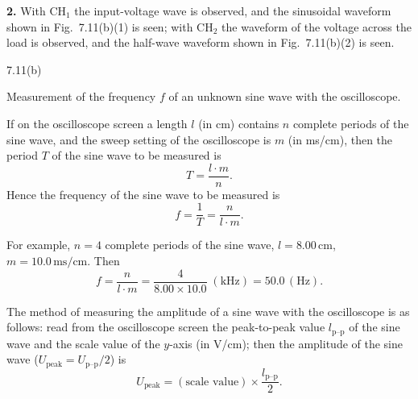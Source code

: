 \textbf{2.} With $\mathrm{CH}_1$ the input-voltage wave is observed, and the sinusoidal waveform shown in Fig.~7.11(b)(1) is seen; with $\mathrm{CH}_2$ the waveform of the voltage across the load is observed, and the half-wave waveform shown in Fig.~7.11(b)(2) is seen.

\begin{figbox}{7.11(b)}
\end{figbox}

Measurement of the frequency $f$ of an unknown sine wave with the oscilloscope.

If on the oscilloscope screen a length $l$ (in cm) contains $n$ complete periods of the sine wave, and the sweep setting of the oscilloscope is $m$ (in ms/cm), then the period $T$ of the sine wave to be measured is
\[
T=\frac{l\cdot m}{n}.
\]
Hence the frequency of the sine wave to be measured is
\[
f=\frac{1}{T}=\frac{n}{l\cdot m}.
\]

For example, $n=4$ complete periods of the sine wave, $l=8.00\,\mathrm{cm}$, $m=10.0\,\mathrm{ms/cm}$. Then
\[
f=\frac{n}{l\cdot m}=\frac{4}{8.00\times10.0}\;(\mathrm{kHz})=50.0\,(\mathrm{Hz}).
\]

The method of measuring the amplitude of a sine wave with the oscilloscope is as follows: read from the oscilloscope screen the peak-to-peak value $l_{\text{p--p}}$ of the sine wave and the scale value of the $y$-axis (in V/cm); then the amplitude of the sine wave ($U_{\text{peak}}=U_{\text{p--p}}/2$) is
\[
U_{\text{peak}}=(\text{scale value})\times\frac{l_{\text{p--p}}}{2}.
\]

